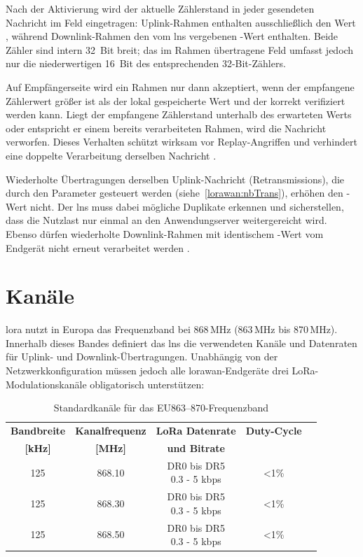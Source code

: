 	Nach der Aktivierung wird der aktuelle Zählerstand in jeder gesendeten Nachricht im Feld  eingetragen: Uplink-Rahmen enthalten ausschlie{\ss}lich den Wert , während Downlink-Rahmen den vom \ac{lns} vergebenen -Wert enthalten. Beide Zähler sind intern 32~Bit breit; das im Rahmen übertragene Feld  umfasst jedoch nur die niederwertigen 16~Bit des entsprechenden 32-Bit-Zählers.

	Auf Empfängerseite wird ein Rahmen nur dann akzeptiert, wenn der empfangene Zählerwert grö{\ss}er ist als der lokal gespeicherte Wert und der  korrekt verifiziert werden kann. Liegt der empfangene Zählerstand unterhalb des erwarteten Werts oder entspricht er einem bereits verarbeiteten Rahmen, wird die Nachricht verworfen. Dieses Verhalten schützt wirksam vor Replay-Angriffen und verhindert eine doppelte Verarbeitung derselben Nachricht \cite{Montagny:2022}.

	Wiederholte Übertragungen derselben Uplink-Nachricht (Retransmissions), die durch den Parameter  gesteuert werden (siehe~\autoref{lorawan:nbTrans}), erhöhen den -Wert nicht. Der \ac{lns} muss dabei mögliche Duplikate erkennen und sicherstellen, dass die Nutzlast nur einmal an den Anwendungserver weitergereicht wird. Ebenso dürfen wiederholte Downlink-Rahmen mit identischem -Wert vom Endgerät nicht erneut verarbeitet werden \cite{LoRaAlliance:2020b}.

\section{Kanäle}
	\ac{lora} nutzt in Europa das Frequenzband bei 868\,MHz (863\,MHz bis 870\,MHz). Innerhalb dieses Bandes definiert das \ac{lns} die verwendeten Kanäle und Datenraten für Uplink- und Downlink-Übertragungen. Unabhängig von der Netzwerkkonfiguration müssen jedoch alle \ac{lorawan}-Endgeräte drei LoRa-Modulationskanäle obligatorisch unterstützen:

	\begin{table}[H]
		\centering
		\begin{tabular}{|c|c|c|c|c|}
			\hline
			\textbf{{Bandbreite}} & 
			\textbf{{Kanalfrequenz}} & 
			\textbf{{LoRa Datenrate}} &
			\textbf{Duty-Cycle} \\
			
			\textbf{[kHz]} & 
			\textbf{[MHz]} & 
			\textbf{und Bitrate} & \\ 
			\hline
			125 & 868.10 & \shortstack{DR0 bis DR5 \\ 0.3 - 5 kbps} & <1\% \\
			\hline
			125 & 868.30 & \shortstack{DR0 bis DR5 \\ 0.3 - 5 kbps} & <1\% \\
			\hline
			125 & 868.50 & \shortstack{DR0 bis DR5 \\ 0.3 - 5 kbps} & <1\% \\
			\hline
		\end{tabular}
		\caption{Standardkanäle für das EU863--870-Frequenzband \cite{LoRaAlliance:2022}}
	\end{table}


